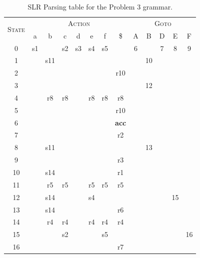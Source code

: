 \begin{table}[H]
\begin{center}
\begin{tabular}{c | cc cc cc c | cc cc c} %
	\hline \hline
	\multirow{2}{*}{\textsc{State}} & \multicolumn{7}{c|}{\textsc{Action}} & \multicolumn{5}{c}{\textsc{Goto}} \\ \cline{2-13}
	   & a  & b  & c  & d  & e  & f  & \$  & A  & B  & D  & E  & F  \\ \hline
	0  & s1 &    & s2 & s3 & s4 & s5 &     & 6  &    & 7  & 8  & 9  \\ 
	1  &    &s11 &    &    &    &    &     &    & 10 &    &    &    \\
	2  &    &    &    &    &    &    &r10  &    &    &    &    &    \\
	3  &    &    &    &    &    &    &     &    & 12 &    &    &    \\
	4  &    &r8  & r8 &    & r8 & r8 & r8  &    &    &    &    &    \\
	5  &    &    &    &    &    &    &r10  &    &    &    &    &    \\  
	6  &    &    &    &    &    &    & \textbf{acc} & & & &    &    \\  
	7  &    &    &    &    &    &    &r2   &    &    &    &    &    \\ 
	8  &    &s11 &    &    &    &    &     &    & 13 &    &    &    \\ 
	9  &    &    &    &    &    &    & r3  &    &    &    &    &    \\
    10 &    & s14&    &    &    &    & r1  &    &    &    &    &    \\
	11 &    & r5 &r5  &    &r5  &r5  &r5   &    &    &    &    &    \\
	12 &    &s14 &    &    &s4  &    &     &    &    &    & 15 &    \\
	13 &    &s14 &    &    &    &    &r6   &    &    &    &    &    \\
	14 &    &r4  &r4  &    &r4  &r4  &r4   &    &    &    &    &    \\
	15 &    &    &s2  &    &    &s5  &     &    &    &    &    &16  \\
	16 &    &    &    &    &    &    &r7   &    &    &    &    &    \\
\end{tabular}
\end{center}
\caption{SLR Parsing table for the Problem 3 grammar.}
\label{tab:1-3-b}
\end{table}

